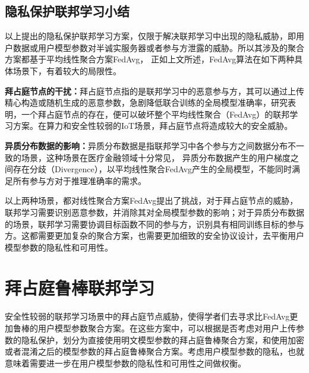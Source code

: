 \subsection{隐私保护联邦学习小结}
以上提出的隐私保护联邦学习方案，仅限于解决联邦学习中出现的隐私威胁，即用户数据或用户模型参数对半诚实服务器或者参与方泄露的威胁。所以其涉及的聚合方案都基于平均线性聚合方案FedAvg\cite{mcmahan2017communication}，
正如上文所述，FedAvg算法在如下两种具体场景下，有着较大的局限性。
\begin{compactitem}
	\item \textbf{拜占庭节点的干扰：}拜占庭节点指的是联邦学习中的恶意参与方，其可以通过上传精心构造或随机生成的恶意参数，急剧降低联合训练的全局模型准确率，研究\cite{blanchard2017machine}表明，一个拜占庭节点的存在，便可以破坏整个平均线性聚合（FedAvg）的联邦学习方案。在算力和安全性较弱的IoT场景，拜占庭节点将造成较大的安全威胁。
	\item \textbf{异质分布数据的影响：}异质分布数据是指联邦学习中各个参与方之间数据分布不一致的场景，这种场景在医疗金融领域十分常见\cite{li2020federated, gao2022feddc, ghosh2020efficient, briggs2020federated}，
	异质分布数据产生的用户梯度之间存在分歧（Divergence），以平均线性聚合FedAvg产生的全局模型，不能同时满足所有参与方对于推理准确率的需求。
\end{compactitem}
以上两种场景，都对线性聚合方案FedAvg提出了挑战，对于拜占庭节点的威胁，联邦学习需要识别恶意参数，并消除其对全局模型参数的影响；对于异质分布数据的场景，联邦学习需要协调目标函数不同的参与方，识别具有相同训练目标的参与方。这都需要更加复杂的聚合方案，也需要更加细致的安全协议设计，去平衡用户模型参数的隐私性和可用性。

\section{拜占庭鲁棒联邦学习}
\label{sec:byzantine}
安全性较弱的联邦学习场景中的拜占庭节点威胁，使得学者们去寻求比FedAvg更加鲁棒的用户模型参数聚合方案\cite{blanchard2017machine, guerraoui2018hidden, yin2018byzantine, DBLP:conf/ndss/CaoF0G21, he2020secure, hashemi2021byzantine, khazbak2020mlguard, liu2021privacy, nguyen2022flame, hao2021efficient, dong2021flod}。在这些方案中，可以根据是否考虑对用户上传参数的隐私保护，划分为直接使用明文模型参数的拜占庭鲁棒聚合方案\cite{blanchard2017machine, guerraoui2018hidden, yin2018byzantine, DBLP:conf/ndss/CaoF0G21}，和使用加密或者混淆之后的模型参数的拜占庭鲁棒聚合方案\cite{he2020secure, hashemi2021byzantine, khazbak2020mlguard, liu2021privacy, nguyen2022flame, hao2021efficient, dong2021flod}。考虑用户模型参数的隐私，也就意味着需要进一步在用户模型参数的隐私性和可用性之间做权衡。

